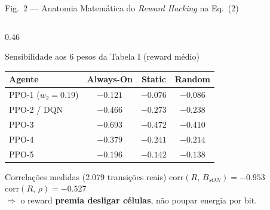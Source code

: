 \documentclass[aspectratio=169,10pt,xcolor={dvipsnames,table}]{beamer}
\begin{document}
\begin{frame}{Fig.\ 2 --- Anatomia Matem\'atica do \emph{Reward Hacking} na Eq.~(2)}
\begin{columns}[T]
\begin{column}{0.46\textwidth}
\begin{block}{Sensibilidade aos 6 pesos da Tabela I (reward médio)}
        \centering\scriptsize
        \begin{tabular}{@{}lccc@{}}
          \toprule
          Agente & Always-On & Static & \textbf{Random} \\
          \midrule
          PPO-1 ($w_2{=}\mathbf{0.19}$) & $-0.121$ & \cellcolor{okgreen!20}$\mathbf{-0.076}$ & $-0.086$ \\
          PPO-2 / DQN & $-0.466$ & $-0.273$ & \cellcolor{alertred!15}$\mathbf{-0.238}$ \\
          PPO-3 & $-0.693$ & $-0.472$ & \cellcolor{alertred!15}$\mathbf{-0.410}$ \\
          PPO-4 & $-0.379$ & $-0.241$ & \cellcolor{alertred!15}$\mathbf{-0.214}$ \\
          PPO-5 & $-0.196$ & $-0.142$ & \cellcolor{alertred!15}$\mathbf{-0.138}$ \\
          \bottomrule
        \end{tabular}
      \end{block}
      \vspace{-1mm}
      \begin{alertblock}{Correlações medidas (2.079 transições reais)}
        \small
        $\mathrm{corr}(R,\,B_{sON}) = \mathbf{-0.953}$ \quad
        $\mathrm{corr}(R,\,\rho) = -0.527$\\
        $\Rightarrow$ o reward \textbf{premia desligar células},
        não poupar energia por bit.
      \end{alertblock}
    \end{column}
  \end{columns}
\end{frame}
\end{document}
